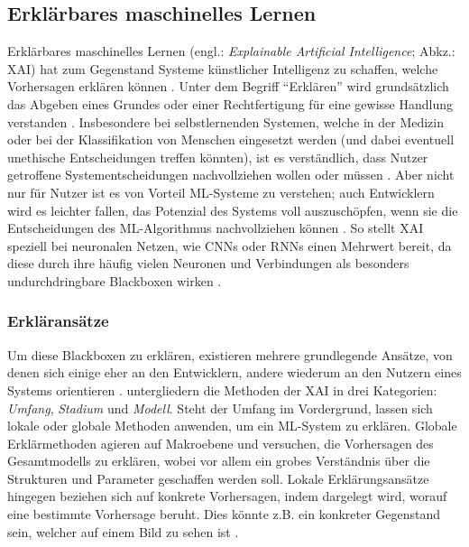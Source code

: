 \subsection{Erklärbares maschinelles Lernen}
\label{subsec:XAI}
Erklärbares maschinelles Lernen (engl.: \emph{Explainable Artificial Intelligence}; Abkz.: XAI) hat zum Gegenstand Systeme künstlicher Intelligenz zu schaffen, welche Vorhersagen erklären können \cite{xu2019explainable, sheh2018defining}.
Unter dem Begriff \enquote{Erklären} wird grundsätzlich das Abgeben eines Grundes oder einer Rechtfertigung für eine gewisse Handlung verstanden \cite{doran2017does}. Insbesondere bei selbstlernenden Systemen, welche in der Medizin oder bei der Klassifikation von Menschen eingesetzt werden (und dabei eventuell unethische Entscheidungen treffen könnten), ist es verständlich, dass Nutzer getroffene Systementscheidungen nachvollziehen wollen oder müssen \cite{antoniadi2021current, xu2019explainable}. Aber nicht nur für Nutzer ist es von Vorteil ML-Systeme zu verstehen; auch Entwicklern wird es leichter fallen, das Potenzial des Systems voll auszuschöpfen, wenn sie die Entscheidungen des ML-Algorithmus nachvollziehen können \cite{xu2019explainable}. So stellt XAI speziell bei neuronalen Netzen, wie CNNs oder RNNs einen Mehrwert bereit, da diese durch ihre häufig vielen Neuronen und Verbindungen als besonders undurchdringbare Blackboxen wirken \cite{xu2019explainable, Ng.2018}.

\subsubsection{Erkläransätze}
\label{subsubsec:Erklaeransaetze}
Um diese Blackboxen zu erklären, existieren mehrere grundlegende Ansätze, von denen sich einige eher an den Entwicklern, andere wiederum an den Nutzern eines Systems orientieren \cite{xu2019explainable}. \cite{kamath2021explainable} untergliedern die Methoden der XAI in drei Kategorien: \emph{Umfang}, \emph{Stadium} und \emph{Modell}. Steht der Umfang im Vordergrund, lassen sich lokale oder globale Methoden anwenden, um ein ML-System zu erklären. Globale Erklärmethoden agieren auf Makroebene und versuchen, die Vorhersagen des Gesamtmodells zu erklären, wobei vor allem ein grobes Verständnis über die Strukturen und Parameter geschaffen werden soll. Lokale Erklärungsansätze hingegen beziehen sich auf konkrete Vorhersagen, indem dargelegt wird, worauf eine bestimmte Vorhersage beruht. Dies könnte z.B. ein konkreter Gegenstand sein, welcher auf einem Bild zu sehen ist \cite{kamath2021explainable}.

